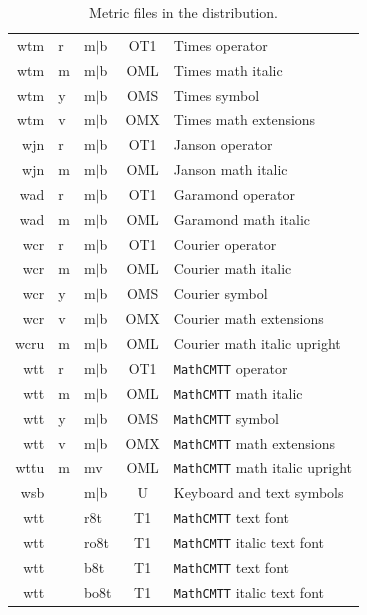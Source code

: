 \documentclass{article}
\newcommand{\Janson}[1]{{\fontfamily{pjn}\fontencoding{T1}%
\fontshape{n}\selectfont #1}}
\newcommand{\Garamond}[1]{{\fontfamily{pad}\fontencoding{T1}%
\fontshape{n}\selectfont #1}}
\newcommand{\Times}[1]{{\fontfamily{ptm}\fontencoding{T1}%
\fontshape{n}\selectfont #1}}
\newcommand{\cmtt}{\texttt{MathCMTT}\xspace}
\begin{document}
\begin{table}
\caption[Metric files in the distribution]{Metric files in the distribution.}
\begin{center}
\begin{tabular}{|rll | c | l|}
\hline\hline
\textsf{wtm}&\textsf{r}&\textsf{m$\vert$b} & OT1 & \Times{Times} operator\\
\textsf{wtm}&\textsf{m}&\textsf{m$\vert$b} & OML & \Times{Times} math italic\\
\textsf{wtm}&\textsf{y}&\textsf{m$\vert$b} & OMS & \Times{Times} symbol\\
\textsf{wtm}&\textsf{v}&\textsf{m$\vert$b} & OMX & \Times{Times} math extensions\\
\hline
\textsf{wjn}&\textsf{r}&\textsf{m$\vert$b} & OT1 & \Janson{Janson} operator\\
\textsf{wjn}&\textsf{m}&\textsf{m$\vert$b} & OML & \Janson{Janson} math italic\\
\hline
\textsf{wad}&\textsf{r}&\textsf{m$\vert$b} & OT1 & \Garamond{Garamond} operator\\
\textsf{wad}&\textsf{m}&\textsf{m$\vert$b} & OML & \Garamond{Garamond} math italic\\
\hline
\textsf{wcr}&\textsf{r}&\textsf{m$\vert$b} & OT1 & Courier operator\\
\textsf{wcr}&\textsf{m}&\textsf{m$\vert$b} & OML & Courier math italic\\
\textsf{wcr}&\textsf{y}&\textsf{m$\vert$b} & OMS & Courier symbol\\
\textsf{wcr}&\textsf{v}&\textsf{m$\vert$b} & OMX & Courier math extensions\\
\textsf{wcru}&\textsf{m}&\textsf{m$\vert$b} & OML & Courier math italic upright\\
\hline
\textsf{wtt}&\textsf{r}&\textsf{m$\vert$b} & OT1 & \cmtt operator\\
\textsf{wtt}&\textsf{m}&\textsf{m$\vert$b} & OML & \cmtt  math italic\\
\textsf{wtt}&\textsf{y}&\textsf{m$\vert$b} & OMS & \cmtt  symbol\\
\textsf{wtt}&\textsf{v}&\textsf{m$\vert$b} & OMX & \cmtt  math extensions\\
\textsf{wttu}&\textsf{m}&\textsf{mv} & OML & \cmtt math italic upright\\
\hline
\textsf{wsb} & & \textsf{m$\vert$b}  &  U  &  Keyboard and text symbols \\
\hline
\textsf{wtt} & & \textsf{r8t}         & T1 &  \cmtt  text font\\
\textsf{wtt} & & \textsf{ro8t}         & T1 &  \cmtt  italic text font\\
\textsf{wtt} & & \textsf{b8t}         & T1 &  \cmtt  text font\\
\textsf{wtt} & & \textsf{bo8t}         & T1 &  \cmtt italic text font\\
\hline
\end{tabular}
\end{center}
\end{table}
\end{document}
